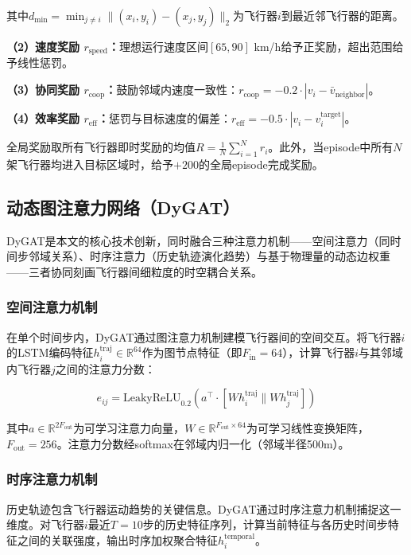 \documentclass[12pt,a4paper,UTF8]{ctexart}
\begin{document}
其中$d_{\min} = \min_{j \neq i} \|(x_i, y_i) - (x_j, y_j)\|_2$为飞行器$i$到最近邻飞行器的距离。

\textbf{（2）速度奖励 $r_{\text{speed}}$：}理想运行速度区间$[65, 90]$ km/h给予正奖励，超出范围给予线性惩罚。

\textbf{（3）协同奖励 $r_{\text{coop}}$：}鼓励邻域内速度一致性：$r_{\text{coop}} = -0.2 \cdot |v_i - \bar{v}_{\text{neighbor}}|$。

\textbf{（4）效率奖励 $r_{\text{eff}}$：}惩罚与目标速度的偏差：$r_{\text{eff}} = -0.5 \cdot |v_i - v_i^{\text{target}}|$。

全局奖励取所有飞行器即时奖励的均值$R = \frac{1}{N}\sum_{i=1}^{N} r_i$。此外，当episode中所有$N$架飞行器均进入目标区域时，给予$+200$的全局episode完成奖励。

\subsection{动态图注意力网络（DyGAT）}

DyGAT是本文的核心技术创新，同时融合三种注意力机制——空间注意力（同时间步邻域关系）、时序注意力（历史轨迹演化趋势）与基于物理量的动态边权重——三者协同刻画飞行器间细粒度的时空耦合关系。

\subsubsection{空间注意力机制}

在单个时间步内，DyGAT通过图注意力机制建模飞行器间的空间交互。将飞行器$i$的LSTM编码特征$h_i^{\text{traj}} \in \mathbb{R}^{64}$作为图节点特征（即$F_{\text{in}}=64$），计算飞行器$i$与其邻域内飞行器$j$之间的注意力分数：

\begin{equation}
    e_{ij} = \text{LeakyReLU}_{0.2}\left(a^{\top} \cdot [W h_i^{\text{traj}} \parallel W h_j^{\text{traj}}]\right)
\end{equation}

其中$a \in \mathbb{R}^{2F_{\text{out}}}$为可学习注意力向量，$W \in \mathbb{R}^{F_{\text{out}} \times 64}$为可学习线性变换矩阵，$F_{\text{out}}=256$。注意力分数经softmax在邻域内归一化（邻域半径500m）。

\subsubsection{时序注意力机制}

历史轨迹包含飞行器运动趋势的关键信息。DyGAT通过时序注意力机制捕捉这一维度。对飞行器$i$最近$T=10$步的历史特征序列，计算当前特征与各历史时间步特征之间的关联强度，输出时序加权聚合特征$h_i^{\text{temporal}}$。
\end{document}
